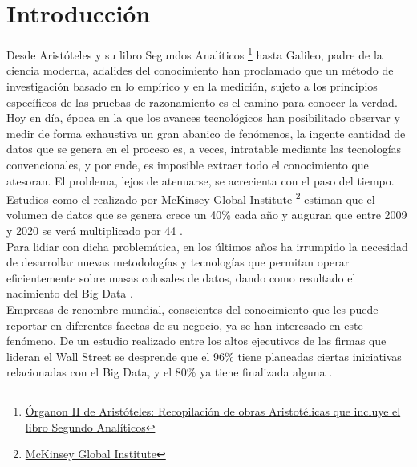 
\pagestyle{fancy}

\chapter{Introducción}
\label{introduccion}

Desde Aristóteles y su libro Segundos Analíticos \footnote{\href{https://docs.google.com/a/datik.es/file/d/0By4kcbi6MzzdUHhVQnUtcTNUdk0/view}{Órganon II de Aristóteles: Recopilación de obras Aristotélicas que incluye el libro Segundo Analíticos}} hasta Galileo, padre de la ciencia moderna, adalides del conocimiento han proclamado que un método de investigación basado en lo empírico y en la medición, sujeto a los principios específicos de las pruebas de razonamiento es el camino para conocer la verdad.\\

Hoy en día, época en la que los avances tecnológicos han posibilitado observar y medir de forma exhaustiva un gran abanico de fenómenos, la ingente cantidad de datos que se genera en el proceso es, a veces, intratable mediante las tecnologías convencionales, y por ende, es imposible extraer todo el conocimiento que atesoran. El problema, lejos de atenuarse, se acrecienta con el paso del tiempo. Estudios como el realizado por McKinsey Global Institute \footnote{\href{http://www.mckinsey.com/mgi/overview}{McKinsey Global Institute}} estiman que el volumen de datos que se genera crece un 40\% cada año y auguran que entre 2009 y 2020 se verá multiplicado por 44 \cite{nambiartowards}.\\

Para lidiar con dicha problemática, en los últimos años ha irrumpido la necesidad de desarrollar nuevas metodologías y tecnologías que permitan operar eficientemente sobre masas colosales de datos, dando como resultado el nacimiento del Big Data \cite{manyika2011big}.\\

Empresas de renombre mundial, conscientes del conocimiento que les puede reportar en diferentes facetas de su negocio, ya se han interesado en este fenómeno. De un estudio realizado entre los altos ejecutivos de las firmas que lideran el Wall Street se desprende que el 96\% tiene planeadas ciertas iniciativas relacionadas con el Big Data, y el 80\% ya tiene finalizada alguna \cite{bdes:2013}. 

